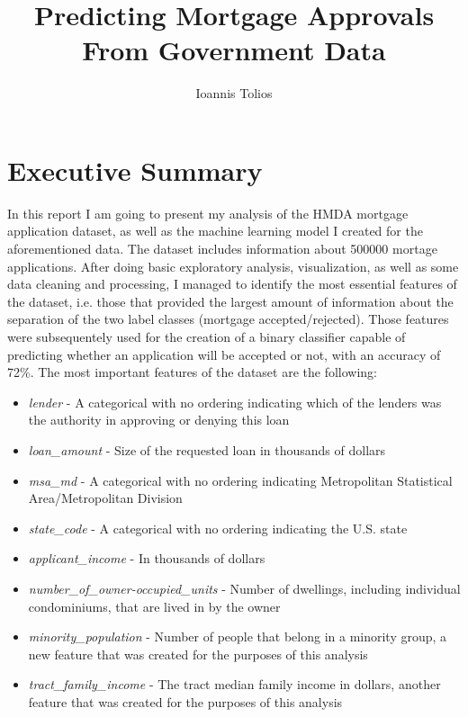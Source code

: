 \documentclass[11pt]{article}
\title{Predicting Mortgage Approvals From Government Data}
\author{Ioannis Tolios}
\providecommand{\tightlist}{%
      \setlength{\itemsep}{0pt}\setlength{\parskip}{0pt}}
\begin{document}
    
    
    \maketitle
    
    

    
    \section{Executive Summary}\label{executive-summary}

In this report I am going to present my analysis of the HMDA mortgage
application dataset, as well as the machine learning model I created for
the aforementioned data. The dataset includes information about 500000
mortage applications. After doing basic exploratory analysis,
visualization, as well as some data cleaning and processing, I managed
to identify the most essential features of the dataset, i.e. those that
provided the largest amount of information about the separation of the
two label classes (mortgage accepted/rejected). Those features were
subsequentely used for the creation of a binary classifier capable of
predicting whether an application will be accepted or not, with an
accuracy of 72\%. The most important features of the dataset are the
following:

\begin{itemize}
\tightlist
\item
  \emph{lender} - A categorical with no ordering indicating which of the
  lenders was the authority in approving or denying this loan
\item
  \emph{loan\_amount} - Size of the requested loan in thousands of
  dollars
\item
  \emph{msa\_md} - A categorical with no ordering indicating
  Metropolitan Statistical Area/Metropolitan Division
\item
  \emph{state\_code} - A categorical with no ordering indicating the
  U.S. state
\item
  \emph{applicant\_income} - In thousands of dollars
\item
  \emph{number\_of\_owner-occupied\_units} - Number of dwellings,
  including individual condominiums, that are lived in by the owner
\item
  \emph{minority\_population} - Number of people that belong in a
  minority group, a new feature that was created for the purposes of
  this analysis
\item
  \emph{tract\_family\_income} - The tract median family income in
  dollars, another feature that was created for the purposes of this
  analysis
\end{itemize}
\end{document}
